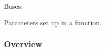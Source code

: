 \documentclass[letterpaper,10pt,english]{sphinxmanual}
\begin{document}

\begin{fulllineitems}
\label{\detokenize{autoapi/euromod/core/index:euromod.core.Parameter}}
\pysigstartsignatures
{}
\pysigstopsignatures
\sphinxAtStartPar
Bases: 

\sphinxAtStartPar
Parameters set up in a function.
\subsubsection*{Overview}



\end{fulllineitems}
\end{document}
